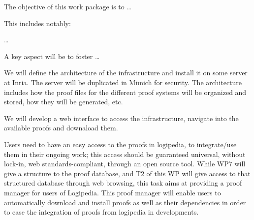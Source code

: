 \begin{workpackage}[id=access,wphases=0-48,type=MGT,
  short=Access,%
  title={Access to the infrastructure},
  lead=Inr,
  InrRM=28,
  OcaRM=6]
  
\begin{wpobjectives}
  The objective of this work package is to \ldots

This includes notably:
  \begin{compactitem}
  \item \ldots
  \end{compactitem}
  A key aspect will be to foster \ldots
\end{wpobjectives}

\begin{wpdescription}

\end{wpdescription}

\begin{tasklist}

  \begin{task}[id=basic,title=Defining the architecture of the infrastructure]
    We will define the architecture of the infrastructure and install
    it on some server at Inria. The server will be duplicated in
    Münich for security. The architecture includes how the proof files
    for the different proof systems will be organized and stored, how
    they will be generated, etc.
  \end{task}

  \begin{task}[id=web,title=Giving access to the infrastructure on the world-wide web]
    We will develop a web interface to access the infrastructure,
    navigate into the available proofs and downaload them.
  \end{task}

  \begin{task}[id=opam,title=Giving access to the infrastructure in proof tools]
    Users need to have an easy access to the proofs in logipedia, to integrate/use
    them in their ongoing work; this access should be guaranteed universal, without
    lock-in, web standards-compliant, through an open source tool. While WP7
    will give a structure to the proof database, and T2 of this WP will give access
    to that structured database through web browsing, this task aims at
    providing a proof manager for users of Logipedia. This proof manager
    will enable users to automatically download and install proofs as well as their
    dependencies in order to ease the integration of proofs from logipedia in
    developments.


\end{task}
\end{tasklist}
\end{workpackage}
